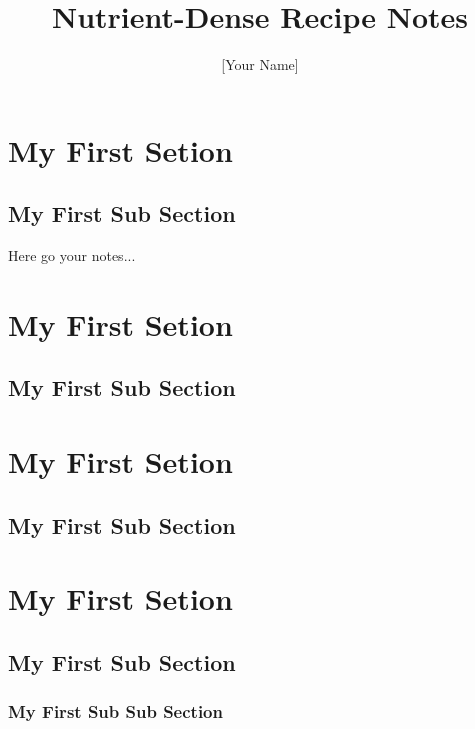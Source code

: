 \documentclass{notestyle}
\title{Nutrient-Dense Recipe Notes}
\author{[Your Name]}
\begin{document}
\maketitle
\tableofcontents
\clearpage
\section{My First Setion}
\subsection{My First Sub Section}
Here go your notes...
\lipsum[2-4]

\section{My First Setion}
\subsection{My First Sub Section}
\lipsum[2-4]

\section{My First Setion}
\subsection{My First Sub Section}
\lipsum[2-4]

\section{My First Setion}
\subsection{My First Sub Section}
\subsubsection{My First Sub Sub Section}
\lipsum[2-4]
\end{document}
